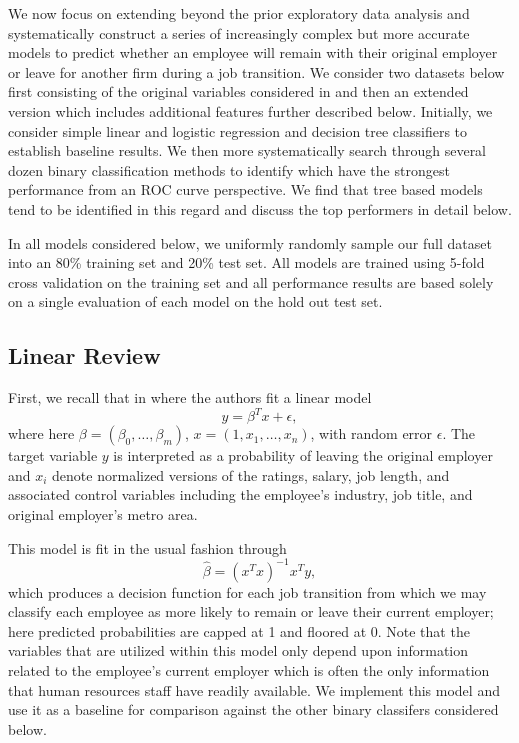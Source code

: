 \documentclass[10pt]{article}
\begin{document}
We now focus on extending beyond the prior exploratory data analysis and systematically construct 
a series of increasingly complex but more accurate 
models to predict whether an employee will remain with their original employer or 
leave for another firm during a job transition.  We consider two datasets below first 
consisting of the original variables considered in \cite{Smart2016} and then an extended 
version which includes additional features further described below. Initially, we 
consider simple linear and logistic regression and decision tree classifiers to establish 
baseline results.  We then more systematically search through several dozen binary classification 
methods to identify which have the strongest performance from an ROC curve perspective.  We find 
that tree based models tend to be identified in this regard and discuss the top performers 
in detail below. 

In all models considered below, we uniformly randomly sample our full dataset into an 80\% training set 
and 20\% test set.  All models are trained using 5-fold cross validation on the training set and all performance 
results are based solely on a single evaluation of each model on the hold out test set.  

\subsection{Linear Review}
First, we recall that in \cite{Smart2016} where the authors fit a linear model 
%
\begin{equation} 
    y = \beta^Tx + \epsilon, 
\end{equation} 
% 
where here $\beta = (\beta_0,\ldots,\beta_m)$, $x=(1,x_1,\ldots,x_{n})$, with random 
error $\epsilon$. The 
target variable $y$ is interpreted as a probability of leaving the original employer and 
$x_i$ denote normalized versions of the ratings, salary, job length, and 
associated control variables including the employee's industry, job title, and original 
employer's metro area.

This model is fit in the usual fashion through 
%
\begin{equation}
    \hat{\beta} = (x^Tx)^{-1}x^Ty,
\end{equation}
%
which produces a decision function for each job transition from which we may classify 
each employee as more likely to remain or leave their current employer; here predicted probabilities 
are capped at 1 and floored at 0. Note that the variables 
that are utilized within this model only depend upon information related to the employee's 
current employer which is often the only information that human resources staff have 
readily available.  We implement this model and use it as a baseline for comparison against the other
binary classifers considered below. 
\end{document}
